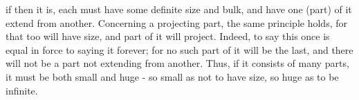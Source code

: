 \documentclass[preview]{standalone}
\begin{document}
\begin{center}
if then it is, each must have some definite size and bulk, and have one (part) of it extend from another. Concerning a projecting part, the same principle holds, for that too will have size, and part of it will project. Indeed, to say this once is equal in force to saying it forever; for no such part of it will be the last, and there will not be a part not extending from another. Thus, if it consists of many parts, it must be both small and huge - so small as not to have size, so huge as to be infinite.
\end{center}
\end{document}
